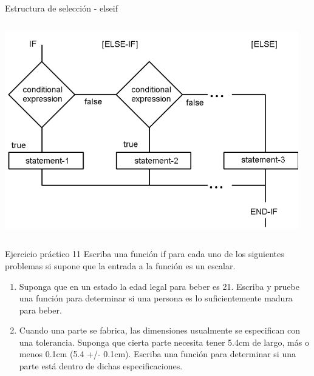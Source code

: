 \documentclass{bredelebeamer}
\begin{document}
\begin{frame}{Estructura de selección - elseif}
\begin{columns}
\begin{column}{0.5\textwidth}
\begin{center}
\includegraphics[scale=0.2]{images/pantalla6.png}
\end{center}
\end{column}
\begin{column}{0.5\textwidth}

\end{column}
\end{columns}
\end{frame}

\begin{frame}{Ejercicio práctico 11}
Escriba una función if para cada uno de los siguientes problemas si supone que la entrada a la función es un escalar.
\begin{enumerate}
\item Suponga que en un estado la edad legal para beber es 21. Escriba y pruebe una función para determinar si una persona es lo suficientemente madura para beber.
\item Cuando una parte se fabrica, las dimensiones usualmente se especifican con una tolerancia. Suponga que cierta parte necesita tener 5.4cm de largo, más o menos 0.1cm (5.4 +/- 0.1cm). Escriba una función para determinar si una parte está dentro de dichas especificaciones.
\end{enumerate}
\end{frame}
\end{document}
